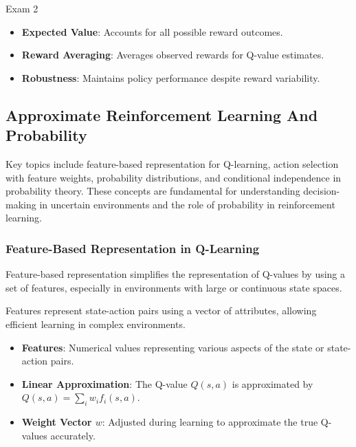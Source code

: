 \begin{examnotes}{Exam 2}
\begin{highlight}
\begin{itemize}
                \begin{itemize}
                    \item \textbf{Expected Value}: Accounts for all possible reward outcomes.
                    \item \textbf{Reward Averaging}: Averages observed rewards for Q-value estimates.
                    \item \textbf{Robustness}: Maintains policy performance despite reward variability.
                \end{itemize}
        \end{itemize}
    \end{highlight}

    \subsection*{Approximate Reinforcement Learning And Probability}

    Key topics include feature-based representation for Q-learning, action selection with feature weights, probability distributions, and conditional independence in probability theory. These concepts 
    are fundamental for understanding decision-making in uncertain environments and the role of probability in reinforcement learning.
    
    \subsubsection*{Feature-Based Representation in Q-Learning}
    
    Feature-based representation simplifies the representation of Q-values by using a set of features, especially in environments with large or continuous state spaces.
    
    \begin{highlight}
        Features represent state-action pairs using a vector of attributes, allowing efficient learning in complex environments.
        
        \begin{itemize}
            \item \textbf{Features}: Numerical values representing various aspects of the state or state-action pairs.
            \item \textbf{Linear Approximation}: The Q-value $Q(s, a)$ is approximated by $Q(s, a) = \sum_i w_i f_i(s, a)$.
            \item \textbf{Weight Vector $w$}: Adjusted during learning to approximate the true Q-values accurately.
        \end{itemize}
    \end{highlight}
    

\end{examnotes}
